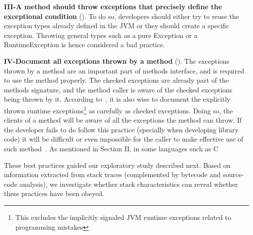 \documentclass[conference]{IEEEtran}
\begin{document}

\textbf{III-A method should throw exceptions that precisely define the
exceptional condition} (\cite{gosling2000java,bloch2008effective}). To do so,
developers should either try to reuse the exception types already defined in the
JVM or they should create a specific exception. Throwing general types such as a
pure Exception or a RuntimeException is hence considered a bad practice.


\textbf{ IV-Document all exceptions thrown by a
method} (\cite{mandrioli1992advances,gosling2000java,wirfs2006toward,bloch2008effective}).
The exceptions thrown by a method are an important part of methods interface,
and is required to use the method properly. The checked exceptions are already
part of the  methods signature, and the method caller is aware of the checked
exceptions being thrown by it. According to~\cite{bloch2008effective}, it is
also wise to document the explicitly thrown runtime exceptions\footnote{This
excludes the implicitly signaled JVM runtime exceptions related to programming
mistakes} as carefully as checked exceptions. Doing so, the clients of a method
will be aware of all the exceptions the method can throw. If the developer fails to
do follow this practice (specially when developing library code) it will be
difficult or even impossible for the caller to make effective use of such 
method~\cite{wirfs2006toward, bloch2008effective}. As mentioned in Section II, 
in some languages such as C

These best practices guided our exploratory study described next.
Based on information extracted from stack traces (complemented by
bytecode and source-code analysis), we investigate whether stack characteristics
can reveal whether these practices have been obeyed. 
\end{document}
